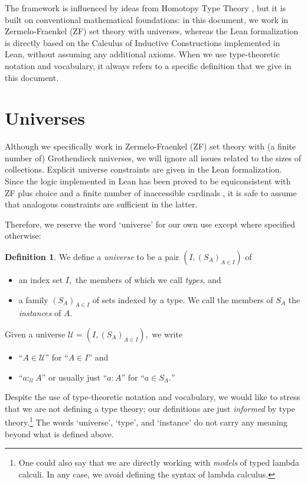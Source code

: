 \documentclass[a4paper]{article}
\theoremstyle{definition}
\newtheorem{definition}{Definition}[section]
\theoremstyle{remark}
\newcommand{\defn}{\emph}
\newcommand{\U}{\mathcal{U}}
\begin{document}
The framework is influenced by ideas from Homotopy Type Theory \cite{hottbook}, but it is built on
conventional mathematical foundations: in this document, we work in Zermelo-Fraenkel (ZF) set
theory with universes, whereas the Lean formalization is directly based on the Calculus of Inductive
Constructions implemented in Lean, without assuming any additional axioms. When we use
type-theoretic notation and vocabulary, it always refers to a specific definition that we give in
this document.

\section{Universes}
\label{sec:universes}

Although we specifically work in Zermelo-Fraenkel (ZF) set theory with (a finite number of)
Grothendieck universes, we will ignore all issues related to the sizes of collections.
Explicit universe constraints are given in the Lean formalization. Since the logic
implemented in Lean has been proved to be equiconsistent with ZF plus choice and a finite
number of inaccessible cardinals \cite{lean-type-theory}, it is safe to assume that analogous
constraints are sufficient in the latter.

Therefore, we reserve the word `universe' for our own use except where specified otherwise:

\begin{definition}
  We define a \defn{universe} to be a pair $(I, (S_A)_{A \in I})$ of
  \begin{itemize}
    \item an index set $I,$ the members of which we call \defn{types}, and
    \item a family $(S_A)_{A \in I}$ of sets indexed by a type. We call the members of $S_A$ the
    \defn{instances} of $A.$
  \end{itemize}
\end{definition}

Given a universe $\U = (I, (S_A)_{A \in I}),$ we write
\begin{itemize}
  \item ``$A \in \U$'' for ``$A \in I$'' and
  \item ``$a :_\U A$'' or usually just ``$a : A$'' for ``$a \in S_A.$''
\end{itemize}

Despite the use of type-theoretic notation and vocabulary, we would like to stress that we are not
defining a type theory; our definitions are just \emph{informed} by type theory.\footnote{One
could also say that we are directly working with \emph{models} of typed lambda calculi. In any case,
we avoid defining the syntax of lambda calculus.}
The words `universe', `type', and `instance' do not carry any meaning beyond what is defined above.
\end{document}
